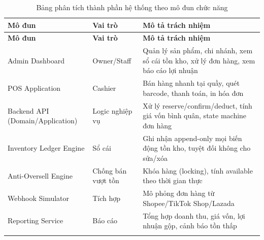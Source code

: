 \begin{longtable}{|p{2.8cm}|p{3.2cm}|p{7.2cm}|}
    \hline
    \textbf{Mô đun} & \textbf{Vai trò} & \textbf{Mô tả trách nhiệm} \\ \hline
    \endfirsthead
    \hline
    \textbf{Mô đun} & \textbf{Vai trò} & \textbf{Mô tả trách nhiệm} \\ \hline
    \endhead
    Admin Dashboard & Owner/Staff & Quản lý sản phẩm, chi nhánh, xem sổ cái tồn kho, xử lý đơn hàng, xem báo cáo lợi nhuận \\ \hline
    POS Application & Cashier & Bán hàng nhanh tại quầy, quét barcode, thanh toán, in hóa đơn \\ \hline
    Backend API (Domain/Application) & Logic nghiệp vụ & Xử lý reserve/confirm/deduct, tính giá vốn bình quân, state machine đơn hàng \\ \hline
    Inventory Ledger Engine & Sổ cái & Ghi nhận append-only mọi biến động tồn kho, tuyệt đối không cho sửa/xóa \\ \hline
    Anti-Oversell Engine & Chống bán vượt tồn & Khóa hàng (locking), tính available theo thời gian thực \\ \hline
    Webhook Simulator & Tích hợp & Mô phỏng đơn hàng từ Shopee/TikTok Shop/Lazada \\ \hline
    Reporting Service & Báo cáo & Tổng hợp doanh thu, giá vốn, lợi nhuận gộp, cảnh báo tồn thấp \\ \hline
    \caption{Bảng phân tích thành phần hệ thống theo mô đun chức năng}
\end{longtable}
\FloatBarrier
